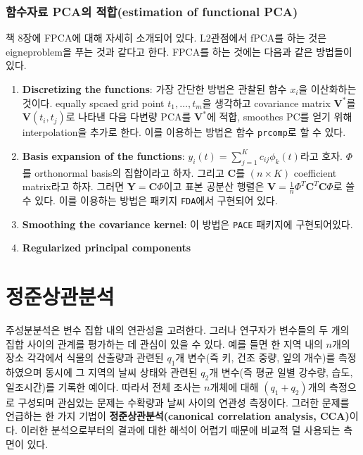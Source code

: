 \documentclass[b5paper,]{scrbook}
\theoremstyle{plain}
\theoremstyle{definition}
\numberwithin{equation}{section}
\begin{document}
\hypertarget{-pca-estimation-of-functional-pca}{%
\subsection{함수자료 PCA의 적합(estimation of functional PCA)}\label{-pca-estimation-of-functional-pca}}

\citep{Ramsay2005} 책 8장에 FPCA에 대해 자세히 소개되어 있다. L2관점에서 fPCA를 하는 것은 eigneproblem을 푸는 것과 같다고 한다. FPCA를 하는 것에는 다음과 같은 방법들이 있다.

\begin{enumerate}
\def\labelenumi{\arabic{enumi}.}
\item
  \textbf{Discretizing the functions}: 가장 간단한 방법은 관찰된 함수 \(x_{i}\)을 이산화하는 것이다. equally spcaed grid point \(t_{1},\ldots , t_{m}\)을 생각하고 covariance matrix \(\mathbf{V}^{*}\)를 \(\mathbf{V}(t_{i},t_{j})\)로 나타낸 다음 다변량 PCA를 \(\mathbf{V}^{*}\)에 적합, smoothes PC를 얻기 위해 interpolation을 추가로 한다. 이를 이용하는 방법은 함수 \texttt{prcomp}로 할 수 있다.
\item
  \textbf{Basis expansion of the functions}: \(y_{i}(t)=\sum_{j=1}^{K}c_{ij}\phi_{k}(t)\)라고 호자. \(\Phi\)를 orthonormal basis의 집합이라고 하자. 그리고 \(\mathbf{C}\)를 \((n\times K)\) coefficient matrix라고 하자. 그러면 \(\mathbf{Y}=\mathbf{C}\Phi\)이고 표본 공분산 행렬은 \(\mathbf{V}=\frac{1}{n}\Phi^{T}\mathbf{C}^{T}\mathbf{C}\Phi\)로 쓸 수 있다. 이를 이용하는 방법은 패키지 \texttt{FDA}에서 구현되어 있다.
\item
  \textbf{Smoothing the covariance kernel}: 이 방법은 \texttt{PACE} 패키지에 구현되어있다.
\item
  \textbf{Regularized principal components}
\end{enumerate}

\hypertarget{CCA}{%
\chapter{정준상관분석}\label{CCA}}

주성분분석은 변수 집합 내의 연관성을 고려한다. 그러나 연구자가 변수들의 두 개의 집합 사이의 관계를 평가하는 데 관심이 있을 수 있다. 예를 들면 한 지역 내의 \(n\)개의 장소 각각에서 식물의 산출량과 관련된 \(q_{1}\)개 변수(즉 키, 건조 중량, 잎의 개수)를 측정하였으며 동시에 그 지역의 날씨 상태와 관련된 \(q_{2}\)개 변수(즉 평균 일별 강수량, 습도, 일조시간)를 기록한 예이다. 따라서 전체 조사는 \(n\)개체에 대해 \((q_{1}+q_{2})\)개의 측정으로 구성되며 관심있는 문제는 수확량과 날씨 사이의 연관성 측정이다. 그러한 문제를 언급하는 한 가지 기법이 \textbf{정준상관분석(canonical correlation analysis, CCA)}이다. 이러한 분석으로부터의 결과에 대한 해석이 어렵기 때문에 비교적 덜 사용되는 측면이 있다.
\end{document}
